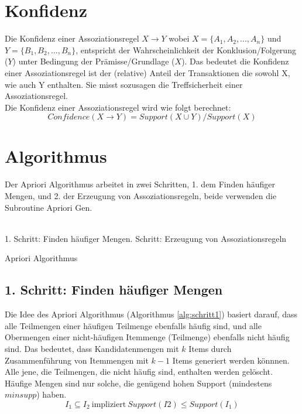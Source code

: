 \section{Konfidenz}
Die Konfidenz einer Assoziationsregel  $X \rightarrow Y$  wobei  $X=\{A_1,A_2,...,A_n\}$ und $Y=\{B_1,B_2,...,B_n\}$, entspricht der Wahrscheinlichkeit der Konklusion/Folgerung ($Y$) unter Bedingung der Prämisse/Grundlage ($X$). Das bedeutet die Konfidenz einer Assoziationsregel ist der (relative) Anteil der Transaktionen die sowohl X, wie auch Y enthalten. Sie misst sozusagen die Treffsicherheit einer Assoziationsregel.
\\
Die Konfidenz einer Assoziationsregel wird wie folgt berechnet:
\begin{equation}
Confidence(X \rightarrow Y) = Support(X \cup Y)/ Support(X)
\end{equation}
\parencite[s.][S. 173f]{TU_Dortmund}
\newpage

\section{Algorithmus}
Der Apriori Algorithmus arbeitet in zwei Schritten, 1. dem Finden häufiger Mengen, und 2. der Erzeugung von Assoziationsregeln, beide verwenden die Subroutine Apriori Gen.
\\
\\
\begin{algorithm}[H]
\label{alg:apriori}
	1. Schritt: Finden häufiger Mengen. Schritt: Erzeugung von Assoziationsregeln\;
\caption{Apriori Algorithmus \parencite[s.][S. 93]{Business_Intelligence}}
\end{algorithm}
\bigskip


\subsection{1. Schritt:  Finden häufiger Mengen}

Die Idee des Apriori Algorithmus (Algorithmus \ref{alg:schritt1}) basiert darauf, dass alle Teilmengen einer häufigen Teilmenge ebenfalls häufig sind, und alle Obermengen einer nicht-häufigen Itemmenge (Teilmenge) ebenfalls nicht häufig sind. 
Das bedeutet, dass Kandidatenmengen mit $k$ Items durch Zusammenführung von Itemmengen mit $k-1$ Items generiert werden könnnen. Alle jene, die Teilmengen, die nicht häufig sind, enthalten werden gelöscht. Häufige Mengen sind nur solche, die genügend hohen Support (mindestens $minsupp$) haben. 
\parencite[s.][2 Discovering Large Itemsets
]{IBM}
\parencite[s.][S. 175]{TU_Dortmund}
\begin{equation}
I_1 \subseteq I_2 \ \mbox{impliziert} \ Support(I2) \leq Support(I_1)
\end{equation}
\bigskip
\bigskip

